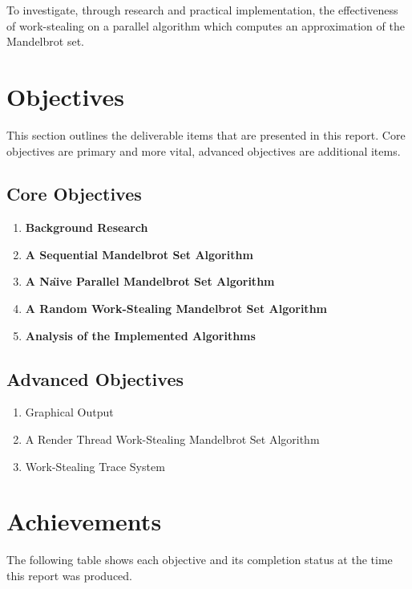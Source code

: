 To investigate, through research and practical implementation, the effectiveness of work-stealing on
a parallel algorithm which computes an approximation of the Mandelbrot set.

\section*{Objectives}
This section outlines the deliverable items that are presented in this report.
Core objectives are primary and more vital, advanced objectives are additional items.

\subsection*{Core Objectives}
\begin{enumerate}
\item \textbf{Background Research}
\item \textbf{A Sequential Mandelbrot Set Algorithm}
\item \textbf{A Na\"{\i}ve Parallel Mandelbrot Set Algorithm}
\item \textbf{A Random Work-Stealing Mandelbrot Set Algorithm}
\item \textbf{Analysis of the Implemented Algorithms}
\setcounter{saveenum}{\value{enumi}}
\end{enumerate}

\subsection*{Advanced Objectives}
\begin{enumerate}
\setcounter{enumi}{\value{saveenum}}
\item Graphical Output
\item A Render Thread Work-Stealing Mandelbrot Set Algorithm
\item Work-Stealing Trace System
\end{enumerate}

\section*{Achievements}
The following table shows each objective and its completion status at the time this
report was produced. 

